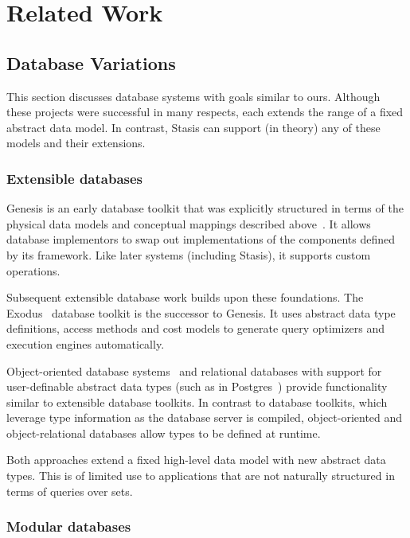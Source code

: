 \documentclass[letterpaper,twocolumn,10pt]{article}
\newcommand{\yad}{Stasis\xspace}
\begin{document}
\section{Related Work}
\label{sec:related-work}

\subsection{Database Variations} 
\label{sec:otherDBs}

This section discusses database systems with goals similar to ours.
Although these projects were successful in many respects, each extends
the range of a fixed abstract data model.  In contrast, \yad can
support (in theory) any of these models and their extensions.

\subsubsection{Extensible databases}

Genesis is an early database toolkit that was explicitly structured in
terms of the physical data models and conceptual mappings described
above~\cite{genesis}.  It allows database implementors to swap out
implementations of the components defined by its framework.  Like
later systems (including \yad), it supports custom operations.

Subsequent extensible database work builds upon these foundations.
The Exodus~\cite{exodus} database toolkit is the successor to
Genesis. It uses abstract data type definitions, access methods and
cost models to  generate query optimizers and execution
engines automatically.

Object-oriented database systems~\cite{objectstore} and
relational databases with support for user-definable abstract data
types (such as in Postgres~\cite{postgres}) provide functionality
similar to extensible database toolkits.  In contrast to database
toolkits, which leverage type information as the database server is
compiled, object-oriented and object-relational databases allow types
to be defined at runtime.

Both approaches extend a fixed high-level data model with new
abstract data types.  This is of limited use to applications that are
not naturally structured in terms of queries over sets.

\subsubsection{Modular databases}
\end{document}
